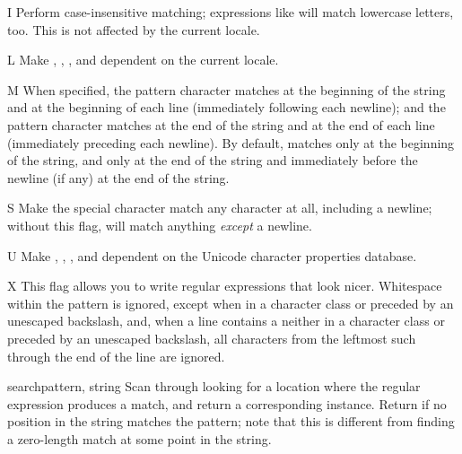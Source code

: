 \begin{datadesc}{I}
Perform case-insensitive matching; expressions like \regexp{[A-Z]}
will match lowercase letters, too.  This is not affected by the
current locale.
\end{datadesc}

\begin{datadesc}{L}
Make , , , and
 dependent on the current locale.
\end{datadesc}

\begin{datadesc}{M}
When specified, the pattern character \character{\textasciicircum}
matches at the beginning of the string and at the beginning of each
line (immediately following each newline); and the pattern character
\character{\$} matches at the end of the string and at the end of each
line (immediately preceding each newline).  By default,
\character{\textasciicircum} matches only at the beginning of the
string, and \character{\$} only at the end of the string and
immediately before the newline (if any) at the end of the string.
\end{datadesc}

\begin{datadesc}{S}
Make the  special character match any character at all,
including a newline; without this flag,  will match
anything \emph{except} a newline.
\end{datadesc}

\begin{datadesc}{U}
Make , , , and
 dependent on the Unicode character properties database.
\end{datadesc}

\begin{datadesc}{X}
This flag allows you to write regular expressions that look nicer.
Whitespace within the pattern is ignored,
except when in a character class or preceded by an unescaped
backslash, and, when a line contains a \character{\#} neither in a
character class or preceded by an unescaped backslash, all characters
from the leftmost such \character{\#} through the end of the line are
ignored.
\end{datadesc}


\begin{funcdesc}{search}{pattern, string}
  Scan through  looking for a location where the regular
  expression  produces a match, and return a
  corresponding  instance.
  Return  if no
  position in the string matches the pattern; note that this is
  different from finding a zero-length match at some point in the string.
\end{funcdesc}

